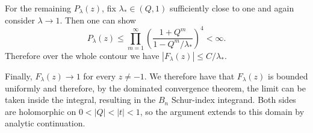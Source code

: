 For the remaining $P_\lambda (z)$, fix $\lambda_*\in(Q,1)$ sufficiently close to
one and again consider $\lambda \rightarrow 1$. Then one can show
\begin{equation}
  P_\lambda(z)\leqslant \prod_{m=1}^\infty
  \left(\frac{1+Q^m}{1-Q^m/\lambda_*}\right)^4 <\infty.
\end{equation}
Therefore over the whole contour we have $|F_\lambda(z)|\leqslant C/\lambda_*$.

Finally, $F_\lambda(z)\to1$ for every $z\ne-1$. We therefore have that
$F_\lambda(z)$ is bounded uniformly and therefore, by the dominated convergence
theorem, the limit can be taken inside the integral, resulting in the \(B_n\)
Schur-index integrand.
Both sides are holomorphic on $0<|Q|<|t|<1$, so the argument extends to this
domain by analytic continuation.
